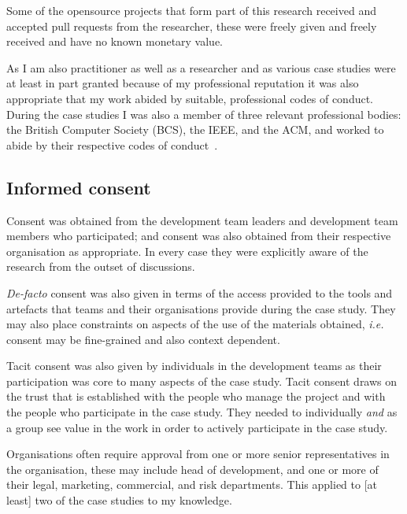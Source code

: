 
Some of the opensource projects that form part of this research received and accepted pull requests from the researcher, these were freely given and freely received and have no known monetary value.


As I am also practitioner as well as a researcher and as various case studies were at least in part granted because of my professional reputation it was also appropriate that my work abided by suitable, professional codes of conduct.   
During the case studies I was also a member of three relevant professional bodies: the British Computer Society (BCS), the IEEE, and the ACM, and worked to abide by their respective codes of conduct~\citep{bcs_code_of_conduct_2021, ieee_and_acm_code_1999on}.


\subsection{Informed consent}
Consent was obtained from the development team leaders and development team members who participated; and consent was also obtained from their respective organisation as appropriate. In every case they were explicitly aware of the research from the outset of discussions.

\textit{De-facto} consent was also given in terms of the access provided to the tools and artefacts that teams and their organisations provide during the case study. They may also place constraints on aspects of the use of the materials obtained, \textit{i.e.} consent may be fine-grained and also context dependent.

Tacit consent was also given by individuals in the development teams as their participation was core to many aspects of the case study. Tacit consent draws on the trust that is established with the people who manage the project and with the people who participate in the case study. They needed to individually \textit{and} as a group see value in the work in order to actively participate in the case study.


Organisations often require approval from one or more senior representatives in the organisation, these may include head of development, and one or more of their legal, marketing, commercial, and risk departments. This applied to [at least] two of the case studies to my knowledge.

